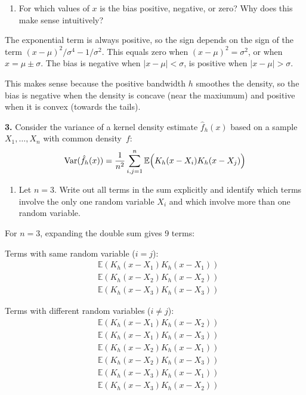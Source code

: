 \documentclass[
  a4paper,
]{article}
\providecommand{\tightlist}{%
  \setlength{\itemsep}{0pt}\setlength{\parskip}{0pt}}
\theoremstyle{definition}
\theoremstyle{definition}
\theoremstyle{definition}
\theoremstyle{definition}
\theoremstyle{remark}
\begin{document}
\begin{enumerate}
\def\labelenumi{\alph{enumi}.}
\setcounter{enumi}{2}
\tightlist
\item
  For which values of \(x\) is the bias positive, negative, or zero?
  Why does this make sense intuitively?
\end{enumerate}

\begin{myanswers}
The exponential term is always positive, so the sign depends on
the sign of the term
\((x-\mu)^2 / \sigma^4 - 1/\sigma^2\).
This equals zero when \((x-\mu)^2 = \sigma^2\), or when \(x = \mu \pm \sigma\).
The bias
is negative when \(|x-\mu| < \sigma\),
is positive when \(|x-\mu| > \sigma\).

This makes sense because the positive bandwidth \(h\) smoothes the density, so
the bias is negative when the density is concave (near the maxiumum) and
positive when it is convex (towards the tails).

\end{myanswers}

\textbf{3.} Consider the variance of a kernel density estimate \(\hat f_h(x)\) based
on a sample \(X_1, \ldots, X_n\) with common density~\(f\):
\begin{equation*}
  \mathop{\mathrm{Var}}(\hat f_h(x))
  = \frac{1}{n^2} \sum_{i,j=1}^n \mathbb{E}\Bigl( K_h(x - X_i)K_h(x - X_j) \Bigr)
\end{equation*}

\begin{enumerate}
\def\labelenumi{\alph{enumi}.}
\tightlist
\item
  Let \(n=3\). Write out all terms in the sum explicitly and identify which
  terms involve the only one random variable \(X_i\) and which involve
  more than one random variable.
\end{enumerate}

\begin{myanswers}
For \(n=3\), expanding the double sum gives 9 terms:

Terms with same random variable (\(i=j\)):
\begin{align*}
& \mathbb{E}(K_h(x - X_1)K_h(x - X_1)) \\
& \mathbb{E}(K_h(x - X_2)K_h(x - X_2)) \\
& \mathbb{E}(K_h(x - X_3)K_h(x - X_3))
\end{align*}

Terms with different random variables (\(i\neq j\)):
\begin{align*}
& \mathbb{E}(K_h(x - X_1)K_h(x - X_2)) \\
& \mathbb{E}(K_h(x - X_1)K_h(x - X_3)) \\
& \mathbb{E}(K_h(x - X_2)K_h(x - X_1)) \\
& \mathbb{E}(K_h(x - X_2)K_h(x - X_3)) \\
& \mathbb{E}(K_h(x - X_3)K_h(x - X_1)) \\
& \mathbb{E}(K_h(x - X_3)K_h(x - X_2))
\end{align*}

\end{myanswers}
\end{document}
